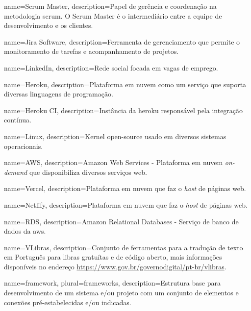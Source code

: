 
 {
	name=Scrum Master,
	description={Papel de gerência e coordenação na metodologia \gls{scrum}. O Scrum Master é o intermediário entre a equipe de desenvolvimento e os clientes.}
}

 {
	name=Jira Software,
	description={Ferramenta de gerenciamento que permite o monitoramento de tarefas e acompanhamento de projetos.}
}   

 {
	name=LinkedIn,
	description={Rede social focada em vagas de emprego.}
}   

 {
	name=Heroku,
	description={Plataforma em nuvem como um serviço que suporta diversas linguagens de programação.}
} 

 {
	name=Heroku CI,
	description={Instância da \gls{heroku} responsável pela integração contínua.}
} 

 {
	name=Linux,
	description={Kernel open-source usado em diversos sistemas operacionais.}
}   

 {
	name=AWS,
	description={Amazon Web Services - Plataforma em nuvem \emph{on-demand} que disponibiliza diversos serviços web.}
}    

 {
	name=Vercel,
	description={Plataforma em nuvem que faz o \emph{host} de páginas web.}
}  

 {
	name=Netlify,
	description={Plataforma em nuvem que faz o \emph{host} de páginas web.}
}  

 {
	name=RDS,
	description={Amazon Relational Databases - Serviço de banco de dados da \gls{aws}.}
}

 {
	name=VLibras,
	description={Conjunto de ferramentas para a tradução de texto em Português para \ac{libras} gratuítas e de código aberto, mais informações disponíveis no endereço \url{https://www.gov.br/governodigital/pt-br/vlibras}.}
}

 {
	name=framework,
	plural=frameworks,
	description={Estrutura base para desenvolvimento de um sistema e/ou projeto com um conjunto de elementos e conexões pré-estabelecidas e/ou indicadas.}
}

